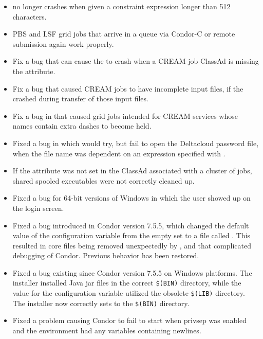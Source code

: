 \begin{itemize}
\item {} no longer crashes when given a constraint expression 
longer than 512 characters. 

\item PBS and LSF grid jobs that arrive in a queue via Condor-C
or remote submission again work properly. 

\item Fix a bug that can cause the  to crash 
when a CREAM job ClassAd is missing the  attribute. 

\item Fix a bug that caused CREAM jobs to have incomplete input files,
if the  crashed during transfer of those input files. 

\item Fix a bug in  that caused grid jobs intended for 
CREAM services whose names contain extra dashes to become held. 

\item Fixed a bug in which  would try, 
but fail to open the Deltacloud password file,
when the file name was dependent on an expression specified with \Expr{\$\$()}.

\item If the  attribute was not set in the ClassAd associated
with a cluster of jobs,
shared spooled executables were not correctly cleaned up.

\item Fixed a bug for 64-bit versions of Windows in which the
user  showed up on the login screen.

\item Fixed a bug introduced in Condor version 7.5.5,
which changed the default value of the configuration variable
 from the empty set to a file called .
This resulted in core files being removed unexpectedly by ,
and that complicated debugging of Condor.
Previous behavior has been restored.

\item Fixed a bug existing since Condor version 7.5.5 on Windows platforms.
The installer installed Java jar files in the correct \verb|$(BIN)| directory,
while the value for the configuration variable 
 utilized the obsolete \verb|$(LIB)|
directory.
The installer now correctly sets  
to the \verb|$(BIN)| directory.

\item Fixed a problem causing Condor to fail to start when
privsep was enabled and the environment had any variables
containing newlines.

\end{itemize}

